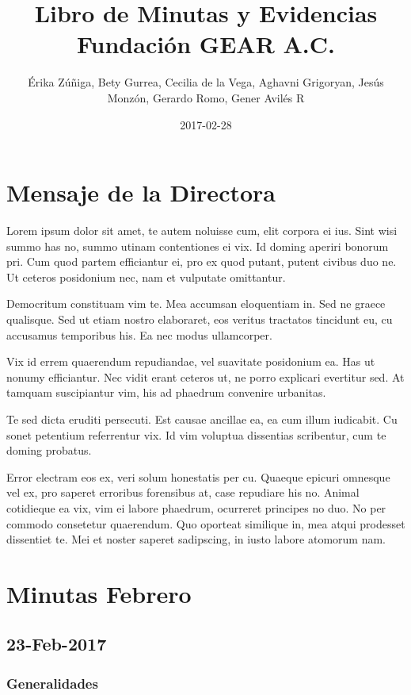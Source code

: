 \documentclass[]{book}
\title{Libro de Minutas y Evidencias Fundación GEAR A.C.}
\author{Érika Zúñiga, Bety Gurrea, Cecilia de la Vega, Aghavni Grigoryan, Jesús
Monzón, Gerardo Romo, Gener Avilés R}
\date{2017-02-28}
\begin{document}
\maketitle

{
\setcounter{tocdepth}{1}
\tableofcontents
}
\chapter{Mensaje de la Directora}\label{mensaje-de-la-directora}

Lorem ipsum dolor sit amet, te autem noluisse cum, elit corpora ei ius.
Sint wisi summo has no, summo utinam contentiones ei vix. Id doming
aperiri bonorum pri. Cum quod partem efficiantur ei, pro ex quod putant,
putent civibus duo ne. Ut ceteros posidonium nec, nam et vulputate
omittantur.

Democritum constituam vim te. Mea accumsan eloquentiam in. Sed ne graece
qualisque. Sed ut etiam nostro elaboraret, eos veritus tractatos
tincidunt eu, cu accusamus temporibus his. Ea nec modus ullamcorper.

Vix id errem quaerendum repudiandae, vel suavitate posidonium ea. Has ut
nonumy efficiantur. Nec vidit erant ceteros ut, ne porro explicari
evertitur sed. At tamquam suscipiantur vim, his ad phaedrum convenire
urbanitas.

Te sed dicta eruditi persecuti. Est causae ancillae ea, ea cum illum
iudicabit. Cu sonet petentium referrentur vix. Id vim voluptua
dissentias scribentur, cum te doming probatus.

Error electram eos ex, veri solum honestatis per cu. Quaeque epicuri
omnesque vel ex, pro saperet erroribus forensibus at, case repudiare his
no. Animal cotidieque ea vix, vim ei labore phaedrum, ocurreret
principes no duo. No per commodo consetetur quaerendum. Quo oporteat
similique in, mea atqui prodesset dissentiet te. Mei et noster saperet
sadipscing, in iusto labore atomorum nam.

\chapter{Minutas Febrero}\label{intro}

\section{23-Feb-2017}\label{feb-2017}

\subsection{Generalidades}\label{generalidades}
\end{document}
